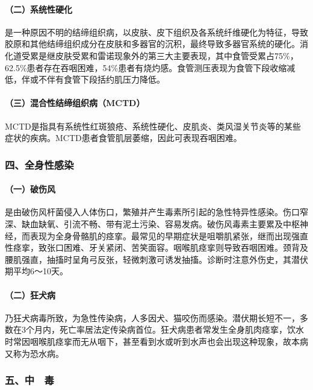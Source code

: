 \paragraph{（二）系统性硬化}

是一种原因不明的结缔组织病，以皮肤、皮下组织及各系统纤维硬化为特征，导致胶原和其他结缔组织成分在皮肤和多器官的沉积，最终导致多器官系统的硬化。消化道受累是继皮肤受累和雷诺现象外的第三大主要表现，其中食管受累占75\%，62.5\%患者存在吞咽困难，54\%患者有烧灼感。食管测压表现为食管下段收缩减低，伴或不伴有食管下段括约肌压力降低。

\paragraph{（三）混合性结缔组织病（MCTD）}

MCTD是指具有系统性红斑狼疮、系统性硬化、皮肌炎、类风湿关节炎等的某些症状的疾病。MCTD患者食管肌层萎缩，因此可表现吞咽困难。

\subsubsection{四、全身性感染}

\paragraph{（一）破伤风}

是由破伤风杆菌侵入人体伤口，繁殖并产生毒素所引起的急性特异性感染。伤口窄深、缺血缺氧、引流不畅、带有泥土污染、容易发病。破伤风毒素主要累及中枢神经，而表现为全身骨骼肌的痉挛。最常见的早期症状是咀嚼肌紧张，继而出现强直性痉挛，致张口困难、牙关紧闭、苦笑面容。咽喉肌痉挛则导致吞咽困难。颈背及腰肌强直，抽搐时呈角弓反张，轻微刺激可诱发抽搐。诊断时注意外伤史，其潜伏期平均6～10天。

\paragraph{（二）狂犬病}

乃狂犬病毒所致，为急性传染病，人多因犬、猫咬伤而感染。潜伏期长短不一，多数在3个月内，死亡率居法定传染病首位。狂犬病患者常发生全身肌肉痉挛，饮水时常因咽喉肌痉挛而无从咽下，甚至看到水或听到水声也会出现这种现象，故本病又称为恐水病。

\subsubsection{五、中　毒}

